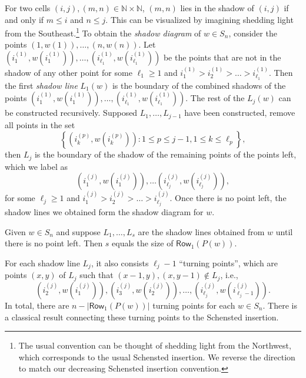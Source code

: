 \documentclass[10pt]{amsart}
\theoremstyle{plain}
\theoremstyle{plain}
\theoremstyle{definition}
\theoremstyle{definition}
\theoremstyle{definition}
\theoremstyle{plain}
\theoremstyle{plain}
\theoremstyle{plain}
\theoremstyle{plain}
\theoremstyle{plain}
\theoremstyle{remark}
\theoremstyle{remark}
\theoremstyle{plain}
\theoremstyle{plain}
\newcommand{\NN}{\mathbb{N}}
\newcommand{\Rowone}[1]
{{\mathsf{{Row}}}_1(P(#1))}
\newcommand{\definition}[1]{{\color{darkred}\emph{#1}}}
\begin{document}
For two cells $(i,j), (m,n) \in \NN\times \NN$, 
$(m,n)$ lies in the shadow of $(i,j)$ if and only if $m \leq i$ and $n \leq j$. This can be visualized by imagining shedding light from the Southeast.\footnote{The usual convention can be thought of shedding light from the Northwest, which corresponds to the usual Schensted insertion. We reverse the direction to match our decreasing Schensted insertion convention.}
To obtain the \definition{shadow diagram} of $w\in S_n$, consider the points $(1,w(1)),\dots, (n,w(n))$. Let $\left(i^{(1)}_1,w(i^{(1)}_1)\right),\dots,\left(i^{(1)}_{\ell_{1}},w(i^{(1)}_{\ell_1})\right)$ be the points that are not in the shadow of any other point for some $\ell_1 \geqslant 1$ and $i^{(1)}_1> i^{(1)}_2>\dots > i^{(1)}_{\ell_1}$. Then the first \definition{shadow line} $L_1(w)$ is the boundary of the combined shadows of the points $\left(i^{(1)}_1,w(i^{(1)}_1)\right),\dots,\left(i^{(1)}_{\ell_1},w(i^{(1)}_{\ell_1})\right)$. The rest of the $L_j(w)$ can be constructed recursively. Supposed $L_1,\dots,L_{j-1}$ have been constructed, remove all points in the set $$\left\{ \left(i^{(p)}_{k},w(i^{(p)}_k)\right): 1\leqslant p \leqslant j-1, 1\leqslant k \leqslant \ell_p \right\},$$ then $L_j$ is the boundary of the shadow of the remaining points of the points left, which we label as 
\[
\left(i^{(j)}_1,w(i^{(j)}_1)\right),\dots \left(i^{(j)}_{\ell_j},w(i^{(j)}_{\ell_j})\right),
\]
for some $\ell_j \geqslant 1$ and $i^{(j)}_1>i^{(j)}_2>\dots>i^{(j)}_{\ell_j}$. Once there is no point left, the shadow lines we obtained form the shadow diagram for $w$.

\begin{ourthm}
Given $w\in S_n$ and suppose $L_1,\dots,L_s$ are the shadow lines obtained from $w$ until there is no point left. Then $s$ equals the size of $\Rowone{w}$.
\end{ourthm}

For each shadow line $L_j$, it also consists $\ell_{j}-1$ ``turning points'', which are points $(x,y)$ of $L_j$ such that $(x-1,y), (x,y-1)\notin L_j$, i.e.,
\[
\left(i^{(j)}_2,w(i^{(j)}_1)\right), \left(i^{(j)}_3,w(i^{(j)}_2)\right), \dots, \left(i^{(j)}_{\ell_j},w(i^{(j)}_{\ell_j-1})\right).
\]
In total, there are $n-|\Rowone{w}|$ turning points for each $w\in S_n$.
There is a classical result connecting
these turning points to the Schensted insertion. 

\end{document}

